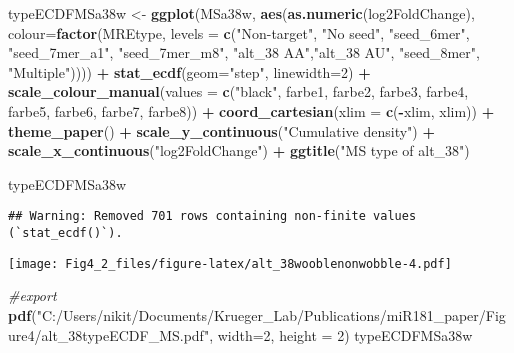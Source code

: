 \documentclass[
]{article}
\newenvironment{Shaded}{\begin{snugshade}}{\end{snugshade}}
\newcommand{\AttributeTok}[1]{\textcolor[rgb]{0.13,0.29,0.53}{#1}}
\newcommand{\CommentTok}[1]{\textcolor[rgb]{0.56,0.35,0.01}{\textit{#1}}}
\newcommand{\DecValTok}[1]{\textcolor[rgb]{0.00,0.00,0.81}{#1}}
\newcommand{\FunctionTok}[1]{\textcolor[rgb]{0.13,0.29,0.53}{\textbf{#1}}}
\newcommand{\NormalTok}[1]{#1}
\newcommand{\OtherTok}[1]{\textcolor[rgb]{0.56,0.35,0.01}{#1}}
\newcommand{\SpecialCharTok}[1]{\textcolor[rgb]{0.81,0.36,0.00}{\textbf{#1}}}
\newcommand{\StringTok}[1]{\textcolor[rgb]{0.31,0.60,0.02}{#1}}
\begin{document}
\begin{Shaded}
\begin{Highlighting}[]
\NormalTok{typeECDFMSa38w }\OtherTok{\textless{}{-}} \FunctionTok{ggplot}\NormalTok{(MSa38w, }\FunctionTok{aes}\NormalTok{(}\FunctionTok{as.numeric}\NormalTok{(log2FoldChange), }
                              \AttributeTok{colour=}\FunctionTok{factor}\NormalTok{(MREtype, }\AttributeTok{levels =} \FunctionTok{c}\NormalTok{(}\StringTok{"Non{-}target"}\NormalTok{, }\StringTok{"No seed"}\NormalTok{, }\StringTok{"seed\_6mer"}\NormalTok{, }\StringTok{"seed\_7mer\_a1"}\NormalTok{, }\StringTok{"seed\_7mer\_m8"}\NormalTok{, }\StringTok{"alt\_38 AA"}\NormalTok{,}\StringTok{"alt\_38 AU"}\NormalTok{, }\StringTok{"seed\_8mer"}\NormalTok{, }\StringTok{"Multiple"}\NormalTok{)))) }\SpecialCharTok{+} 
  \FunctionTok{stat\_ecdf}\NormalTok{(}\AttributeTok{geom=}\StringTok{"step"}\NormalTok{, }\AttributeTok{linewidth=}\DecValTok{2}\NormalTok{) }\SpecialCharTok{+}
  \FunctionTok{scale\_colour\_manual}\NormalTok{(}\AttributeTok{values =} \FunctionTok{c}\NormalTok{(}\StringTok{"black"}\NormalTok{, farbe1, farbe2, farbe3, farbe4, farbe5, farbe6, farbe7, farbe8)) }\SpecialCharTok{+}
  \FunctionTok{coord\_cartesian}\NormalTok{(}\AttributeTok{xlim =} \FunctionTok{c}\NormalTok{(}\SpecialCharTok{{-}}\NormalTok{xlim, xlim)) }\SpecialCharTok{+} 
  \FunctionTok{theme\_paper}\NormalTok{() }\SpecialCharTok{+}
  \FunctionTok{scale\_y\_continuous}\NormalTok{(}\StringTok{"Cumulative density"}\NormalTok{) }\SpecialCharTok{+} \FunctionTok{scale\_x\_continuous}\NormalTok{(}\StringTok{"log2FoldChange"}\NormalTok{) }\SpecialCharTok{+}
  \FunctionTok{ggtitle}\NormalTok{(}\StringTok{"MS type of alt\_38"}\NormalTok{)}

\NormalTok{typeECDFMSa38w}
\end{Highlighting}
\end{Shaded}

\begin{verbatim}
## Warning: Removed 701 rows containing non-finite values (`stat_ecdf()`).
\end{verbatim}

\texttt{[image: Fig4\_2\_files/figure-latex/alt\_38wooblenonwobble-4.pdf]}

\begin{Shaded}
\begin{Highlighting}[]
\CommentTok{\#export}
\FunctionTok{pdf}\NormalTok{(}\StringTok{"C:/Users/nikit/Documents/Krueger\_Lab/Publications/miR181\_paper/Figure4/alt\_38typeECDF\_MS.pdf"}\NormalTok{, }\AttributeTok{width=}\DecValTok{2}\NormalTok{, }\AttributeTok{height =} \DecValTok{2}\NormalTok{)}
\NormalTok{typeECDFMSa38w}
\end{Highlighting}
\end{Shaded}
\end{document}
